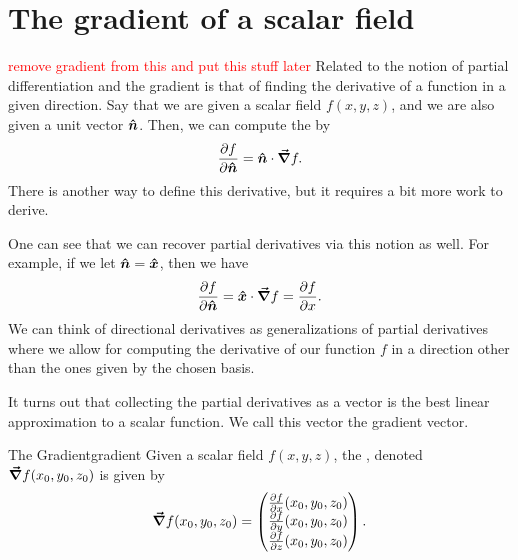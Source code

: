 \section{The gradient of a scalar field}
\textcolor{red}{remove gradient from this and put this stuff later}
                        Related to the notion of partial differentiation and the gradient is that of finding the derivative of a function in a given direction.  Say that we are given a scalar field $f(x,y,z)$, and we are also given a unit vector $\boldsymbol{\hat{n}}$.  Then, we can compute the  by
                        \[
                        \frac{\partial f}{\partial \boldsymbol{\hat{n}}} = \boldsymbol{\hat{n}} \cdot \boldsymbol{\vec{\nabla}} f.
                        \]
                        There is another way to define this derivative, but it requires a bit more work to derive.
                        
                                               
                        One can see that we can recover partial derivatives via this notion as well.  For example, if we let $\boldsymbol{\hat{n}} = \boldsymbol{\hat{x}}$, then we have
                        \[
                        \frac{\partial f}{\partial \boldsymbol{\hat{n}}} = \boldsymbol{\hat{x}} \cdot \boldsymbol{\vec{\nabla}} f = \frac{\partial f}{\partial x}.
                        \]
                        We can think of directional derivatives as generalizations of partial derivatives where we allow for computing the derivative of our function $f$ in a direction other than the ones given by the chosen basis.
                        
                        It turns out that collecting the partial derivatives as a vector is the best linear approximation to a scalar function.  We call this vector the gradient vector.
                        
                        \begin{df}{The Gradient}{gradient}
                        Given a scalar field $f(x,y,z)$, the , denoted $\boldsymbol{\vec{\nabla}} f(x_0,y_0,z_0)$ is given by
                        \[
                        \boldsymbol{\vec{\nabla}} f(x_0,y_0,z_0)=\begin{pmatrix} \frac{\partial f}{\partial x}(x_0,y_0,z_0)\\ \frac{\partial f}{\partial y}(x_0,y_0,z_0)\\ \frac{\partial f}{\partial z}(x_0,y_0,z_0)\end{pmatrix}.
                        \]
                        \end{df}
                        
